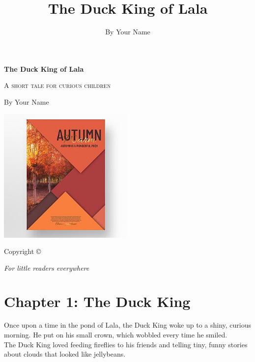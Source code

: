 \documentclass[12pt,openany]{book}
\title{\Huge The Duck King of Lala}
\author{\Large By Your Name}
\date{}
\newcommand{\bigpara}{\fontsize{18}{24}\selectfont}
\begin{document}
\frontmatter

\begin{titlepage}
  \centering
  \vspace*{2cm}
  {\fontsize{36}{44}\selectfont\color{accent}\textbf{The Duck King of Lala}\par}
  \vspace{1.5cm}
  {\Large\textsc{A short tale for curious children}\par}
  \vfill
  {\Large By Your Name\par}
  \vspace{1cm}
  \includegraphics[width=0.5\textwidth]{images/sample_cover_illustration.jpg}
  \vfill
  {\small Copyright © \the\year\par}
\end{titlepage}

\cleardoublepage

\begin{center}
  \vspace*{3cm}
  {\large\itshape For little readers everywhere\par}
\end{center}
\clearpage

\tableofcontents
\clearpage

\mainmatter

\chapter*{Chapter 1: The Duck King}
\thispagestyle{empty}

\bigpara
\begin{flushleft}
Once upon a time in the pond of Lala, the Duck King woke up to a shiny, curious morning. 
He put on his small crown, which wobbled every time he smiled.\\[1em]

The Duck King loved feeding fireflies to his friends and telling tiny, funny stories about clouds that looked like jellybeans.
\end{flushleft}
\end{document}
